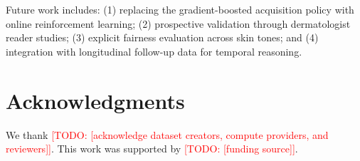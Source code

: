 \documentclass[conference]{IEEEtran}
\newcommand{\todo}[1]{\textcolor{red}{[TODO: #1]}}
\begin{document}
Future work includes: (1) replacing the gradient-boosted acquisition policy with online reinforcement learning; (2) prospective validation through dermatologist reader studies; (3) explicit fairness evaluation across skin tones; and (4) integration with longitudinal follow-up data for temporal reasoning.

\section*{Acknowledgments}

We thank \todo{[acknowledge dataset creators, compute providers, and reviewers]}. This work was supported by \todo{[funding source]}.

\balance


\end{document}
